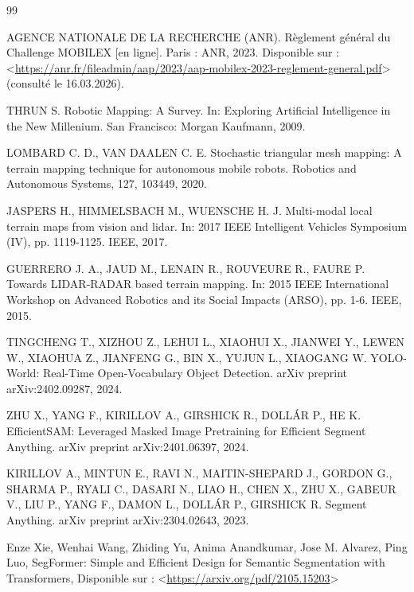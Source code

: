 \begin{thebibliography}{99}

AGENCE NATIONALE DE LA RECHERCHE (ANR). Règlement général du Challenge MOBILEX [en ligne]. Paris : ANR, 2023. Disponible sur : <\href{https://anr.fr/fileadmin/aap/2023/aap-mobilex-2023-reglement-general.pdf}{https://anr.fr/fileadmin/aap/2023/aap-mobilex-2023-reglement-general.pdf}> (consulté le 16.03.2026).

THRUN S. Robotic Mapping: A Survey. In: Exploring Artificial Intelligence in the New Millenium. San Francisco: Morgan Kaufmann, 2009.

LOMBARD C. D., VAN DAALEN C. E. Stochastic triangular mesh mapping: A terrain mapping technique for autonomous mobile robots. Robotics and Autonomous Systems, 127, 103449, 2020.

JASPERS H., HIMMELSBACH M., WUENSCHE H. J. Multi-modal local terrain maps from vision and lidar. In: 2017 IEEE Intelligent Vehicles Symposium (IV), pp. 1119-1125. IEEE, 2017.

GUERRERO J. A., JAUD M., LENAIN R., ROUVEURE R., FAURE P. Towards LIDAR-RADAR based terrain mapping. In: 2015 IEEE International Workshop on Advanced Robotics and its Social Impacts (ARSO), pp. 1-6. IEEE, 2015.

TINGCHENG T., XIZHOU Z., LEHUI L., XIAOHUI X., JIANWEI Y., LEWEN W., XIAOHUA Z., JIANFENG G., BIN X., YUJUN L., XIAOGANG W. YOLO-World: Real-Time Open-Vocabulary Object Detection. arXiv preprint arXiv:2402.09287, 2024.

ZHU X., YANG F., KIRILLOV A., GIRSHICK R., DOLLÁR P., HE K. EfficientSAM: Leveraged Masked Image Pretraining for Efficient Segment Anything. arXiv preprint arXiv:2401.06397, 2024.

KIRILLOV A., MINTUN E., RAVI N., MAITIN-SHEPARD J., GORDON G., SHARMA P., RYALI C., DASARI N., LIAO H., CHEN X., ZHU X., GABEUR V., LIU P., YANG F., DAMON L., DOLLÁR P., GIRSHICK R. Segment Anything. arXiv preprint arXiv:2304.02643, 2023.

Enze Xie, Wenhai Wang, Zhiding Yu, Anima Anandkumar, Jose M. Alvarez, Ping Luo, SegFormer: Simple and Efficient Design for Semantic Segmentation with Transformers, Disponible sur : <\href{https://arxiv.org/pdf/2105.15203}{https://arxiv.org/pdf/2105.15203}>


\end{thebibliography}
